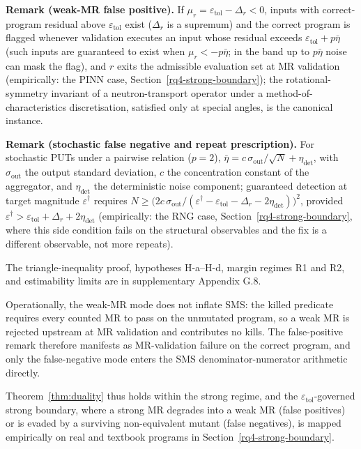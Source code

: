 \documentclass[manuscript,screen,review]{acmart}
\begin{document}
\textbf{Remark (weak-MR false positive).} If
$\mu_r = \varepsilon_{\mathrm{tol}} - \Delta_r < 0$, inputs with
correct-program residual above $\varepsilon_{\mathrm{tol}}$ exist
($\Delta_r$ is a supremum) and the correct program is flagged whenever
validation executes an input whose residual exceeds
$\varepsilon_{\mathrm{tol}} + p\bar\eta$ (such inputs are guaranteed to
exist when $\mu_r < -p\bar\eta$; in the band up to $p\bar\eta$ noise can
mask the flag), and $r$ exits the admissible evaluation set at MR
validation (empirically: the PINN case,
Section~\ref{rq4-strong-boundary}); the rotational-symmetry invariant of
a neutron-transport operator under a method-of-characteristics
discretisation, satisfied only at special angles, is the canonical
instance.

\textbf{Remark (stochastic false negative and repeat prescription).} For
stochastic PUTs under a pairwise relation ($p = 2$),
$\bar\eta = c\,\sigma_{\mathrm{out}}/\sqrt{N} + \eta_{\mathrm{det}}$,
with $\sigma_{\mathrm{out}}$ the output standard deviation, $c$ the
concentration constant of the aggregator, and $\eta_{\mathrm{det}}$ the
deterministic noise component; guaranteed detection at target magnitude
$\varepsilon^\dagger$ requires
$N \geq \bigl(2c\,\sigma_{\mathrm{out}}/(\varepsilon^\dagger - \varepsilon_{\mathrm{tol}} - \Delta_r - 2\eta_{\mathrm{det}})\bigr)^2$,
provided
$\varepsilon^\dagger > \varepsilon_{\mathrm{tol}} + \Delta_r + 2\eta_{\mathrm{det}}$
(empirically: the RNG case, Section~\ref{rq4-strong-boundary}, where
this side condition fails on the structural observables and the fix is a
different observable, not more repeats).

The triangle-inequality proof, hypotheses H-a--H-d, margin regimes R1
and R2, and estimability limits are in supplementary Appendix G.8.

Operationally, the weak-MR mode does not inflate SMS: the killed
predicate requires every counted MR to pass on the unmutated program, so
a weak MR is rejected upstream at MR validation and contributes no
kills. The false-positive remark therefore manifests as MR-validation
failure on the correct program, and only the false-negative mode enters
the SMS denominator-numerator arithmetic directly.

Theorem~\ref{thm:duality} thus holds within the strong regime, and the
$\varepsilon_{\mathrm{tol}}$-governed strong boundary, where a strong
MR degrades into a weak MR (false positives) or is evaded by a surviving
non-equivalent mutant (false negatives), is mapped empirically on real
and textbook programs in Section~\ref{rq4-strong-boundary}.
\end{document}
